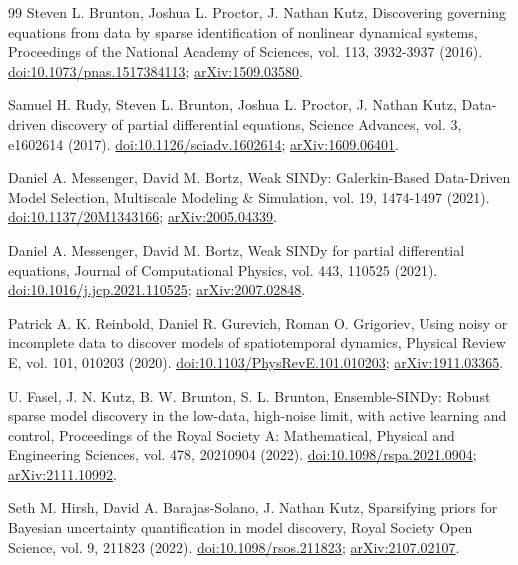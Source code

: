 \documentclass[11pt]{article}
\begin{document}
\begin{thebibliography}{99}
 Steven L. Brunton, Joshua L. Proctor, J. Nathan Kutz, Discovering governing equations from data by sparse identification of nonlinear dynamical systems, Proceedings of the National Academy of Sciences, vol. 113, 3932-3937 (2016). \href{https://doi.org/10.1073/pnas.1517384113}{doi:10.1073/pnas.1517384113}; \href{https://arxiv.org/abs/1509.03580}{arXiv:1509.03580}.

 Samuel H. Rudy, Steven L. Brunton, Joshua L. Proctor, J. Nathan Kutz, Data-driven discovery of partial differential equations, Science Advances, vol. 3, e1602614 (2017). \href{https://doi.org/10.1126/sciadv.1602614}{doi:10.1126/sciadv.1602614}; \href{https://arxiv.org/abs/1609.06401}{arXiv:1609.06401}.

 Daniel A. Messenger, David M. Bortz, Weak SINDy: Galerkin-Based Data-Driven Model Selection, Multiscale Modeling \& Simulation, vol. 19, 1474-1497 (2021). \href{https://doi.org/10.1137/20M1343166}{doi:10.1137/20M1343166}; \href{https://arxiv.org/abs/2005.04339}{arXiv:2005.04339}.

 Daniel A. Messenger, David M. Bortz, Weak SINDy for partial differential equations, Journal of Computational Physics, vol. 443, 110525 (2021). \href{https://doi.org/10.1016/j.jcp.2021.110525}{doi:10.1016/j.jcp.2021.110525}; \href{https://arxiv.org/abs/2007.02848}{arXiv:2007.02848}.

 Patrick A. K. Reinbold, Daniel R. Gurevich, Roman O. Grigoriev, Using noisy or incomplete data to discover models of spatiotemporal dynamics, Physical Review E, vol. 101, 010203 (2020). \href{https://doi.org/10.1103/PhysRevE.101.010203}{doi:10.1103/PhysRevE.101.010203}; \href{https://arxiv.org/abs/1911.03365}{arXiv:1911.03365}.

 U. Fasel, J. N. Kutz, B. W. Brunton, S. L. Brunton, Ensemble-SINDy: Robust sparse model discovery in the low-data, high-noise limit, with active learning and control, Proceedings of the Royal Society A: Mathematical, Physical and Engineering Sciences, vol. 478, 20210904 (2022). \href{https://doi.org/10.1098/rspa.2021.0904}{doi:10.1098/rspa.2021.0904}; \href{https://arxiv.org/abs/2111.10992}{arXiv:2111.10992}.

 Seth M. Hirsh, David A. Barajas-Solano, J. Nathan Kutz, Sparsifying priors for Bayesian uncertainty quantification in model discovery, Royal Society Open Science, vol. 9, 211823 (2022). \href{https://doi.org/10.1098/rsos.211823}{doi:10.1098/rsos.211823}; \href{https://arxiv.org/abs/2107.02107}{arXiv:2107.02107}.


\end{thebibliography}
\end{document}

